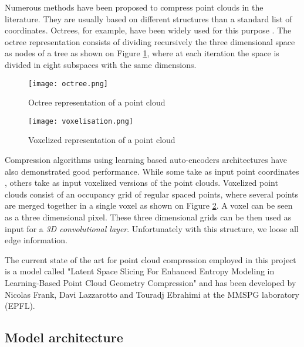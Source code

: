 \label{sec:pcc}

Numerous methods have been proposed to compress point clouds in the literature. They are usually based on different structures than a standard list of coordinates.                                
Octrees, for example, have been widely used for this purpose \cite{bib:octree}. 
The octree representation consists of dividing recursively the three dimensional space as nodes of a tree as shown on Figure \ref{fig:octree}, where at each iteration the space is divided in eight subspaces with the same dimensions.

\begin{figure}
    \centering
    \texttt{[image: octree.png]}
    \caption{Octree representation of a point cloud}
    \label{fig:octree}
\end{figure}

\begin{figure}
    \centering
    \texttt{[image: voxelisation.png]}
    \caption{Voxelized representation of a point cloud}
    \label{fig:voxelized}
\end{figure}

Compression algorithms using learning based auto-encoders architectures have also demonstrated good performance. While some take as input point coordinates \cite{bib:9102866}, others take as input voxelized versions of the point clouds. 
Voxelized point clouds consist of an occupancy grid of regular spaced points, where several points are merged together in a single voxel as shown on Figure \ref{fig:voxelized}.
A voxel can be seen as a three dimensional pixel.
These three dimensional grids can be then used as input for a \textit{3D convolutional layer}. 
Unfortunately with this structure, we loose all edge information.


The current state of the art for point cloud compression employed in this project is a model called "Latent Space Slicing For Enhanced Entropy Modeling in Learning-Based Point Cloud Geometry Compression" and has been developed by Nicolas Frank, Davi Lazzarotto and Touradj Ebrahimi at the MMSPG laboratory (EPFL).

\subsection{Model architecture}
\label{subsec:model-architecture}

